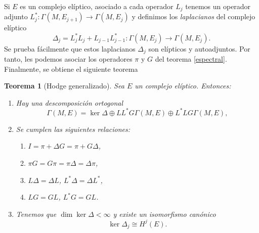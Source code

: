 \documentclass[12pt,a4paper]{article}
\newtheorem{thm}{Teorema}[section]
\theoremstyle{definition} \newtheorem{defn}[thm]{Definición}
\theoremstyle{definition} \newtheorem{ejemplo}[thm]{Ejemplo}
\theoremstyle{definition} \newtheorem{ejercicio}[thm]{Ejercicio}
\theoremstyle{remark} \newtheorem*{obs}{Observación}
\begin{document}
   Si $E$ es un complejo elíptico, asociado a cada operador $L_j$ tenemos un operador adjunto $L_j^*:\Gamma(M,E_{j+1}) \rightarrow \Gamma(M,E_j)$ y definimos los \emph{laplacianos} del complejo elíptico 
   \begin{equation*}
     \Delta_j=L_j^*L_j + L_{j-1}L^*_{j-1}: \Gamma(M,E_j) \rightarrow \Gamma(M,E_j).
   \end{equation*}
   Se prueba fácilmente que estos laplacianos $\Delta_j$ son elípticos y autoadjuntos. Por tanto, les podemos asociar los operadores $\pi$ y $G$ del teorema \ref{espectral}. Finalmente, se obtiene el siguiente teorema
\begin{thm}[Hodge generalizado]
  Sea $E$ un complejo elíptico. Entonces:
  \begin{enumerate}
    \item Hay una descomposición ortogonal
      \begin{equation*}
	\Gamma(M,E)= \ker \Delta \oplus LL^*G\Gamma(M,E) \oplus L^*LG\Gamma(M,E),
      \end{equation*}
    \item Se cumplen las siguientes relaciones:
      \begin{enumerate}
	\item $I=\pi+\Delta G = \pi+G\Delta$,
	\item $\pi G=G\pi=\pi \Delta=\Delta \pi$,
	\item $L\Delta=\Delta L$, $L^*\Delta=\Delta L^*$,
	\item $LG=GL$, $L^*G=GL$.
      \end{enumerate}
    \item Tenemos que $\dim \ker \Delta < \infty$ y existe un isomorfismo canónico
      \begin{equation*}
	\ker \Delta_j \cong H^j(E).
      \end{equation*}
  \end{enumerate}
\end{thm}
\end{document}
